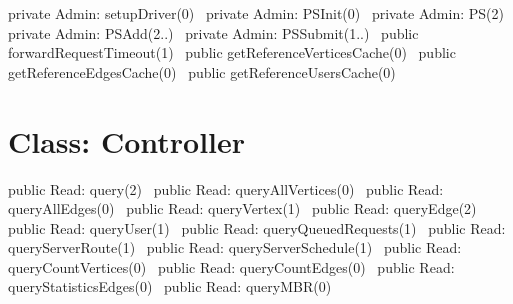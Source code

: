 private \LA{}Admin: setupDriver(0)~{\nwtagstyle{}}\RA{}
private \LA{}Admin: PSInit(0)~{\nwtagstyle{}}\RA{}
private \LA{}Admin: PS(2)~{\nwtagstyle{}}\RA{}
private \LA{}Admin: PSAdd(2..)~{\nwtagstyle{}}\RA{}
private \LA{}Admin: PSSubmit(1..)~{\nwtagstyle{}}\RA{}
public \LA{}forwardRequestTimeout(1)~{\nwtagstyle{}}\RA{}
public \LA{}getReferenceVerticesCache(0)~{\nwtagstyle{}}\RA{}
public \LA{}getReferenceEdgesCache(0)~{\nwtagstyle{}}\RA{}
public \LA{}getReferenceUsersCache(0)~{\nwtagstyle{}}\RA{}
\nwendcode{}\nwdocspar

\section*{Class: Controller}
\nwenddocs{}\endmoddef{}
public \LA{}Read: query(2)~{\nwtagstyle{}}\RA{}
public \LA{}Read: queryAllVertices(0)~{\nwtagstyle{}}\RA{}
public \LA{}Read: queryAllEdges(0)~{\nwtagstyle{}}\RA{}
public \LA{}Read: queryVertex(1)~{\nwtagstyle{}}\RA{}
public \LA{}Read: queryEdge(2)~{\nwtagstyle{}}\RA{}
public \LA{}Read: queryUser(1)~{\nwtagstyle{}}\RA{}
public \LA{}Read: queryQueuedRequests(1)~{\nwtagstyle{}}\RA{}
public \LA{}Read: queryServerRoute(1)~{\nwtagstyle{}}\RA{}
public \LA{}Read: queryServerSchedule(1)~{\nwtagstyle{}}\RA{}
public \LA{}Read: queryCountVertices(0)~{\nwtagstyle{}}\RA{}
public \LA{}Read: queryCountEdges(0)~{\nwtagstyle{}}\RA{}
public \LA{}Read: queryStatisticsEdges(0)~{\nwtagstyle{}}\RA{}
public \LA{}Read: queryMBR(0)~{\nwtagstyle{}}\RA{}
